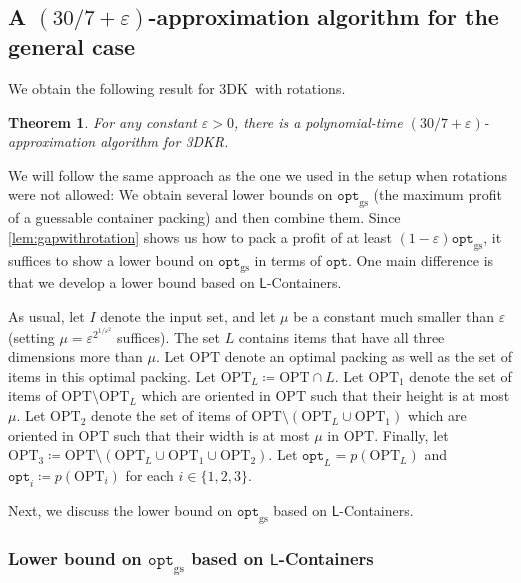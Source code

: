 \documentclass[10pt,a4paper]{amsart}
\newcommand{\deb}[1]{#1}
\newcommand{\kvnr}[1]{}
\newcommand{\eps}{\varepsilon}
\newcommand{\tdk}{\textsc{3DK}}
\newcommand{\tdkr}{\textsc{3DKR}}
\newtheorem{theorem}{Theorem}[section]
\theoremstyle{definition}
\newcommand{\opt}{\mathtt{opt}}
\newcommand{\optgs}{\mathtt{opt}_{\mathrm{gs}}}
\newcommand{\LContainers}{$\mathsf{L}$-Containers}
\newcommand{\OPT}{\mathrm{OPT}}
\begin{document}
\subsection{A \texorpdfstring{$(30/7+\eps)$}{(30/7 + ε)}-approximation algorithm for the general case}
\label{sec:rot-general-case}
We obtain the following result for \tdk~with rotations. 

\begin{theorem}
    \label{thm:3dkrot}
   For any constant $\eps>0$, there is a polynomial-time $(30/7+\eps)$-approximation algorithm for \tdkr. 
\end{theorem}


We will follow the same approach as the one we used in the setup when rotations were not allowed:
We obtain several lower bounds on $\optgs$ (the maximum profit of a guessable container packing) and then combine them.
Since \cref{lem:gapwithrotation} shows us how to pack a profit of at least $(1-\eps)\optgs$, it suffices to show a lower bound on $\optgs$ in terms of $\opt$.
One main difference is that we develop a lower bound based on \LContainers. 

As usual, let $I$ denote the input set, and let $\mu$ be a constant much smaller than $\eps$ (setting $\mu=\eps^{2^{1/\eps^2}}$ suffices).
The set $L$ contains items that have all three dimensions more than $\mu$.
Let $\OPT$ denote an optimal packing as well as the set of items in this optimal packing. 
Let $\OPT_L\coloneqq \OPT\cap L$.
Let $\OPT_1$ denote the set of items of $\OPT\setminus \OPT_L$ which are oriented in $\OPT$
such that their height is at most $\mu$. Let $\OPT_2$ denote the set of items of $\OPT\setminus (\OPT_L\cup\OPT_1)$ which are oriented in $\OPT$
such that their width is at most $\mu$ in $\OPT$. Finally, let $\OPT_3\coloneqq\OPT\setminus(\OPT_L\cup\OPT_1\cup\OPT_2)$.
Let $\opt_L=p(\OPT_L)$ and $\opt_i\coloneqq p(\OPT_i)$ for each $i\in\{1,2,3\}$.

Next, we discuss the lower bound on $\optgs$ based on \LContainers{}.
\subsubsection{Lower bound on \texorpdfstring{$\optgs$}{optgs} based on \texorpdfstring{\LContainers}{L-Containers}}
\label{sec:7by24guarantee}
\end{document}
